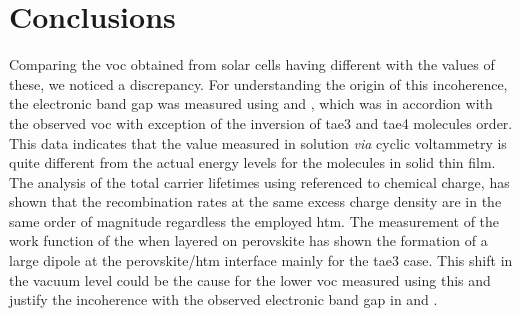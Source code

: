 	\section{Conclusions}
	Comparing the \gls{voc} obtained from solar cells having different  with the  values of these, we noticed a discrepancy.
	For understanding the origin of this incoherence, the electronic band gap was measured using  and , which was in accordion with the observed \gls{voc} with exception of the inversion of \gls{tae3} and \gls{tae4} molecules order.
	This data indicates that the  value measured in solution \textsl{via} cyclic voltammetry is quite different from the actual energy levels for the molecules in solid thin film.
	The analysis of the total carrier lifetimes using  referenced to chemical charge, has shown that the recombination rates at the same excess charge density are in the same order of magnitude regardless the employed \gls{htm}.
	The measurement of the work function of the  when layered on perovskite has shown the formation of a large dipole at the perovskite\-/\gls{htm} interface mainly for the \gls{tae3} case.
	This shift in the vacuum level could be the cause for the lower \gls{voc} measured using this  and justify the incoherence with the observed electronic band gap in  and .
